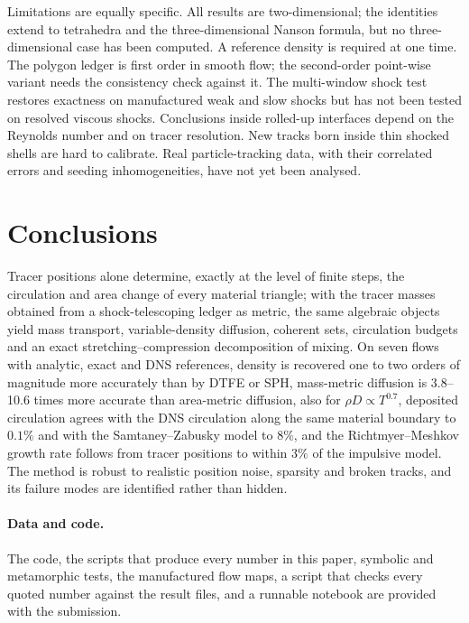 \documentclass[11pt]{article}
\theoremstyle{definition}\newtheorem{definition}{Definition}\theoremstyle{remark}\newtheorem{remark}{Remark}
\begin{document}
Limitations are equally specific. All results are two-dimensional; the identities extend to tetrahedra and the three-dimensional Nanson formula, but no three-dimensional case has been computed. A reference density is required at one time. The polygon ledger is first order in smooth flow; the second-order point-wise variant needs the consistency check against it. The multi-window shock test restores exactness on manufactured weak and slow shocks but has not been tested on resolved viscous shocks. Conclusions inside rolled-up interfaces depend on the Reynolds number and on tracer resolution. New tracks born inside thin shocked shells are hard to calibrate. Real particle-tracking data, with their correlated errors and seeding inhomogeneities, have not yet been analysed.

\section{Conclusions}
Tracer positions alone determine, exactly at the level of finite steps, the circulation and area change of every material triangle; with the tracer masses obtained from a shock-telescoping ledger as metric, the same algebraic objects yield mass transport, variable-density diffusion, coherent sets, circulation budgets and an exact stretching--compression decomposition of mixing. On seven flows with analytic, exact and DNS references, density is recovered one to two orders of magnitude more accurately than by DTFE or SPH, mass-metric diffusion is 3.8--10.6 times more accurate than area-metric diffusion, also for $\rho D\propto T^{0.7}$, deposited circulation agrees with the DNS circulation along the same material boundary to $0.1\%$ and with the Samtaney--Zabusky model to $8\%$, and the Richtmyer--Meshkov growth rate follows from tracer positions to within $3\%$ of the impulsive model. The method is robust to realistic position noise, sparsity and broken tracks, and its failure modes are identified rather than hidden.

\paragraph{Data and code.} The code, the scripts that produce every number in this paper, symbolic and metamorphic tests, the manufactured flow maps, a script that checks every quoted number against the result files, and a runnable notebook are provided with the submission.
\end{document}
